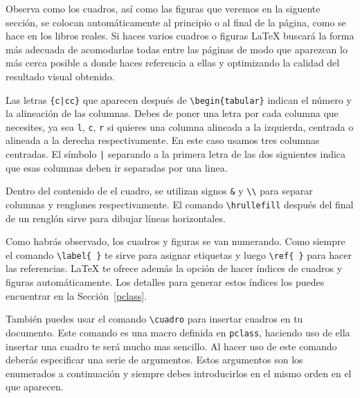 Observa como los cuadros, as\'i como las figuras que veremos en la siguente secci\'on, se colocan autom\'aticamente 
al principio o al final de la p\'agina, como se hace en los libros reales. Si haces varios cuadros o figuras 
\LaTeX{} buscar\'a la forma m\'as adecuada de acomodarlas todas entre las p\'aginas de modo que aparezcan lo m\'as 
cerca posible a donde haces referencia a ellas y optimizando la calidad del resultado visual obtenido.

Las letras \verb#{c|cc}# que aparecen despu\'es de \verb|\begin{tabular}| indican el n\'umero y la alineaci\'on de las columnas. Debes de poner una letra por cada columna que necesites, ya sea \verb|l|, \verb|c|, \verb|r| si quieres una columna alineada a la izquierda, centrada o alineada a la derecha respectivamente. En este caso usamos tres columnas
centradas. El s\'imbolo \verb#|# separando a la primera letra de las dos siguientes indica que esas columnas 
deben ir separadas por una linea.

Dentro del contenido de el cuadro, se utilizan signos \verb|&| y \verb|\\| para separar columnas y renglones respectivamente. 
El comando \verb|\hrullefill| despu\'es del final de un rengl\'on sirve para dibujar l\'ineas horizontales.

Como habr\'as observado, los cuadros y figuras se van numerando. Como siempre el comando \verb|\label{ }| te 
sirve para asignar etiquetas y luego \verb|\ref{ }| para hacer las referencias. \LaTeX{} te ofrece adem\'as la opci\'on 
de hacer \'indices de cuadros y figuras autom\'aticamente. Los detalles para generar estos \'indices los puedes 
encuentrar en la Secci\'on~\ref{pclass}.

Tambi\'en  puedes usar el comando \verb+\cuadro+ para insertar cuadros en tu documento. Este comando es una macro definida en \texttt{pclass}, haciendo uso de ella insertar una cuadro te ser\'a mucho mas sencillo. Al hacer uso 
de este comando deber\'as especificar una serie de argumentos. Estos argumentos son los enumerados a continuaci\'on y
siempre debes introducirlos en el mismo orden en el que aparecen.

